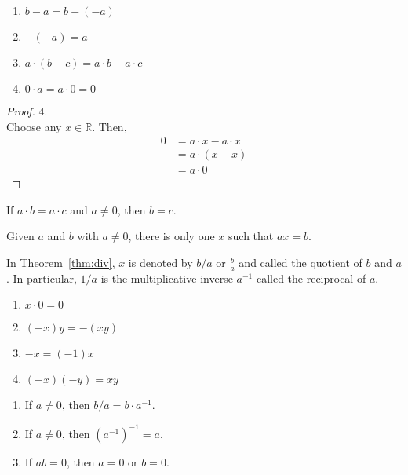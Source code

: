 \documentclass[../main.tex]{subfiles}
\begin{document}
\begin{prop}
    \begin{enumerate}
        \item $b - a = b + (-a)$
        \item $-(-a) = a$
        \item $a \cdot (b - c) = a \cdot b - a \cdot c$
        \item $0 \cdot a = a \cdot 0 = 0$
    \end{enumerate}
\end{prop}
\begin{proof}
    4.\\
    Choose any $x \in \mathbb{R}$.
    Then,
    \begin{align*}
        0 &= a \cdot x - a \cdot x\\
          &= a \cdot (x - x)\\
          &= a \cdot 0
    \end{align*}
\end{proof}

\begin{thm} \label{thm:cancelmulti}
    If $a \cdot b = a \cdot c$ and $a \neq 0$, then $b = c$.
\end{thm}

\begin{thm} \label{thm:div}
    Given $a$ and $b$ with $a \neq 0$, there is only one $x$ such that $ax = b$.
\end{thm}

In Theorem~\ref{thm:div}, $x$ is denoted by $b / a$ or $\frac b a$ and called the \textsf{quotient} of $b$ and $a$.
In particular, $1 / a$ is the multiplicative inverse $a^{-1}$ called the reciprocal of $a$.

\begin{prop}
    \begin{enumerate}
        \item $x \cdot 0 = 0$
        \item $(-x)y = -(xy)$
        \item $-x = (-1)x$
        \item $(-x)(-y) = xy$
    \end{enumerate}
\end{prop}

\begin{prop}
    \begin{enumerate}
        \item If $a \neq 0$, then $b / a = b \cdot a^{-1}$.
        \item If $a \neq 0$, then $(a^{-1})^{-1} = a$.
        \item If $ab = 0$, then $a = 0$ or $b = 0$.
    \end{enumerate}
\end{prop}
\end{document}
